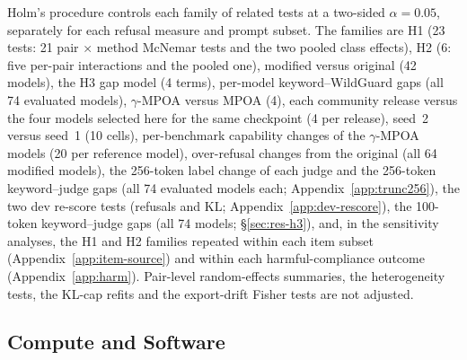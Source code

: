 Holm's procedure controls each family of related tests at a two-sided
$\alpha=0.05$, separately for each refusal measure and prompt subset. The
families are H1 (23 tests: 21 pair $\times$ method McNemar tests and the two
pooled class effects), H2 (6: five per-pair interactions and the pooled one),
modified versus original (42 models), the H3 gap model (4 terms), per-model
keyword--WildGuard gaps (all 74 evaluated models), $\gamma$-MPOA versus MPOA
(4), each community release versus the four models selected here for the same
checkpoint (4 per release), seed~2 versus seed~1 (10 cells), per-benchmark
capability changes of the $\gamma$-MPOA models (20 per reference model),
over-refusal changes from the original (all 64 modified models), the
256-token label change of each judge and the 256-token keyword--judge gaps
(all 74 evaluated models each; Appendix~\ref{app:trunc256}), the two
dev re-score tests (refusals and KL; Appendix~\ref{app:dev-rescore}), the
100-token keyword--judge gaps (all 74 models; \S\ref{sec:res-h3}), and, in the
sensitivity analyses, the H1 and H2 families repeated within each item subset
(Appendix~\ref{app:item-source}) and within each harmful-compliance outcome
(Appendix~\ref{app:harm}). Pair-level random-effects summaries, the
heterogeneity tests, the KL-cap refits and the export-drift Fisher tests are
not adjusted.

\subsection{Compute and Software}
\label{sec:setup-compute}

